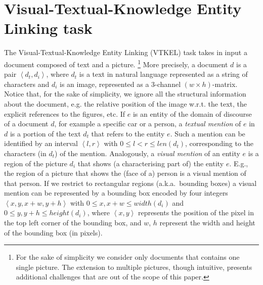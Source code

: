 \documentclass[11pt,a4paper]{article}
\begin{document}


\section{Visual-Textual-Knowledge Entity Linking task}
The Visual-Textual-Knowledge Entity Linking (VTKEL) task takes in input a document composed of text and  a picture.%
\footnote{For the sake of simplicity we consider only documents that contains one single picture. The extension to multiple pictures, though intuitive, presents additional challenges that are out of the scope of this paper.}
%
More precisely, a document $d$ is a pair $\left<d_t,d_i\right>$, where $d_t$ is a text in natural language
represented as a string of characters and $d_i$ is an image, represented as a 3-channel $(w\times h)$-matrix. Notice
that, for the sake of simplicity, we ignore all the structural information about the document, e.g. the relative position of the
image w.r.t. the text, the explicit references to the figures, etc.
%
If $e$ is an entity of the domain of discourse of a document $d$, for example a specific car or a person, a \emph{textual mention} of $e$ in $d$ is a portion of the text $d_t$ that refers to the entity $e$. Such a mention can be identified by an interval $\left<l,r\right>$ with $0\leq l < r \leq len(d_t)$, corresponding to the characters (in $d_t$) of the mention.
%
Analogously, a \emph{visual mention} of an entity $e$ is a region of the picture $d_i$ that shows (a characterising part of) the entity
$e$. E.g., the region of a picture that shows the (face of a) person is a visual mention of that person. If we restrict to rectangular regions (a.k.a.\ bounding boxes) a visual mention can be represented by a bounding box encoded by four integers $\left<x,y,x+w,y+h\right>$ with %
$0\leq x,x+w\leq width(d_i)$ and $0\leq y,y+h\leq height(d_i)$, where $\left<x,y\right>$ represents the position of the pixel in the top
left corner of the bounding box, and $w$, $h$ represent the width and height of the bounding box (in pixels).
\end{document}
